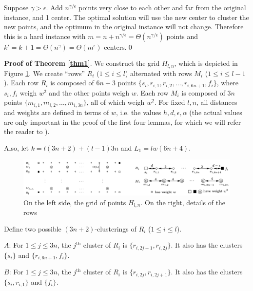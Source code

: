 Suppose $\gamma>\epsilon$. Add $n^{\gamma/\epsilon}$ points very close to each other and far from the original instance, and 1 center. The optimal solution will use the new center to cluster the new points, and the optimum in the original instance will not change. Therefore this is a hard instance with $m= n+n^{\gamma/\epsilon}=\Theta(n^{\gamma/\epsilon})$ points and $k'= k+1=\Theta(n^\gamma)=\Theta(m^\epsilon)$ centers.\qed

\textbf{Proof of Theorem \ref{thm1}}. We construct the grid $H_{l,n}$, which is depicted in Figure \ref{fig:vattani1}. We create ``rows'' $R_i$ ($1\le i \le l$) alternated with rows $M_i$ ($1\le i \le l-1$). Each row $R_i$ is composed of $6n+3$ points $\{s_i,r_{i,1},r_{i,2},\dots,r_{i,6n+1},f_i\}$, where $s_i,f_i$ weigh $w^2$ and the other points weigh $w$. Each row $M_i$ is composed of $3n$ points $\{m_{i,1},m_{i,2},\dots,m_{i,3n}\}$, all of which weigh $w^2$. For fixed $l,n$, all distances and weights are defined in terms of $w$, i.e. the values $h,d,\epsilon,\alpha$ (the actual values are only important in the proof of the first four lemmas, for which we will refer the reader to \cite{vattani}).

Also, let $k=l(3n+2)+(l-1)3n$ and $L_1=lw(6n+4)$.

\begin{figure}
    \centering
    \includegraphics[width=15cm]{chapter_1/files/vattani_fig1.png}
\centering
    \caption{On the left side, the grid of points $H_{l,n}$. On the right, details of the rows \cite{vattani}}
    \label{fig:vattani1}
\end{figure}

\begin{definition}\label{def1}
Define two possible $(3n+2)$-clusterings of $R_i$ ($1\le i \le l$).

$A$: For $1\le j \le 3n$, the $j^{\text{th}}$ cluster of $R_i$ is $\{r_{i,2j-1},r_{i,2j}\}$. It also has the clusters $\{s_i\}$ and $\{r_{i,6n+1},f_i\}$.

$B$: For $1\le j \le 3n$, the $j^{\text{th}}$ cluster of $R_i$ is $\{r_{i,2j},r_{i,2j+1}\}$. It also has the clusters $\{s_i,r_{i,1}\}$ and $\{f_i\}$.
\end{definition}

